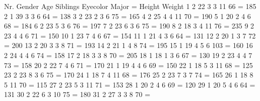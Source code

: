     Nr.        Gender       Age       Siblings   Eyecolor     Major      =
 Height      Weight
     1          2         22          3          3       11         66   =
      185
     2         1        39          3          3      6        64        =
 138
     3          2         23          2          3      6        75      =
   165
     4          2         25          4         4       11         70    =
     190
     5         1        20          2         4      6        68         =
184
     6          2         23          5          3      6        76      =
   197
     7          2         23          6          3      6        75      =
   190
     8          2         18          3         4       11         76    =
     235
     9          2         23          4         4      6        71       =
  150
     10        1        23          7         4      6        67         =
154
     11        1        21          4          3      6        64        =
 131
     12         2         20          1          3     7       72        =
 200
     13         2         20          3          3      8        71      =
   193
     14         2         21          1         4      8        74       =
  195
     15        1        19          4         5      6       103         =
160
     16         2         24          4         4      6        74       =
  158
     17         2         18          3          3      8        70      =
   205
     18        1        18          1          3      6        67        =
 130
     19         2         23          4         4     7       73         =
158
     20         2         22          7         4      6        71       =
  170
     21        1        19          4         4      6        69         =
150
     22        1        18          5          3       11         68     =
    125
     23         2         23          8          3      6        75      =
   170
     24        1        18          7         4       11         68      =
   176
     25         2         23          7          3     7       74        =
 165
     26        1        18          8         5       11         70      =
   115
     27         2         23          5          3       11         71   =
      153
     28        1        20          2         4      6        69         =
120
     29        1        20          5         4      6        64         =
131
     30         2         22          6          3      10         75    =
     180
     31         2         27          3          3      8        70      =
